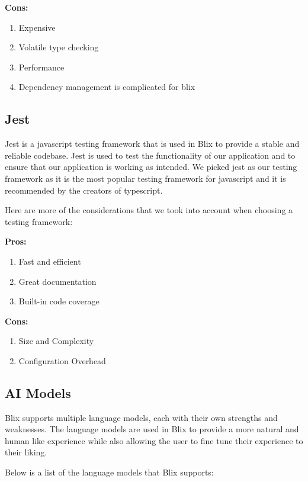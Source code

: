 \documentclass[11pt,a4paper]{article}
\begin{document}
\textbf{Cons:}
\begin{enumerate}[label*=\arabic*.]
	\item[\textbullet] Expensive	
	\item[\textbullet] Volatile type checking
	\item[\textbullet] Performance
	\item[\textbullet] Dependency management is complicated for blix
\end{enumerate}

\subsection{Jest}

Jest is a javascript testing framework that is used in Blix to provide a stable and
reliable codebase. Jest is used to test the functionality of our application and to
ensure that our application is working as intended. We picked jest as our testing
framework as it is the most popular testing framework for javascript and it is
recommended by the creators of typescript.

Here are more of the considerations that we took into account when choosing a testing
framework:

\textbf{Pros:}
\begin{enumerate}[label*=\arabic*.]
    \item [\textbullet] Fast and efficient
	\item [\textbullet] Great documentation
	\item [\textbullet] Built-in code coverage
\end{enumerate}

\textbf{Cons:}
\begin{enumerate}[label*=\arabic*.]
	\item[\textbullet] Size and Complexity	
	\item[\textbullet] Configuration Overhead
\end{enumerate}

\subsection{AI Models}

Blix supports multiple language models, each with their own strengths and weaknesses.
The language models are used in Blix to provide a more natural and human like experience
while also allowing the user to fine tune their experience to their liking.

Below is a list of the language models that Blix supports:
\end{document}
